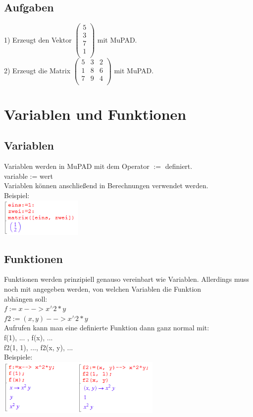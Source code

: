 \documentclass[11pt,final]{scrreprt}
\newcommand{\br} {\medskip\\}
\begin{document}
\subsection{Aufgaben}
1) Erzeugt den Vektor $\left(\begin{matrix}
5\\3\\7\\1\\
\end{matrix}\right)$ mit MuPAD.\\
2) Erzeugt die Matrix $\left(\begin{matrix}
5 & 3 & 2\\1 & 8 & 6\\7 & 9 & 4\\
\end{matrix}\right)$ mit MuPAD.

\section{Variablen und Funktionen}
\subsection{Variablen}
Variablen werden in MuPAD mit dem Operator $:=$ definiert.\\
variable := wert\\
Variablen können anschließend in Berechnungen verwendet werden.\\
Beispiel:\br
\includegraphics[width = 150px]{images/variablen_1}

\subsection{Funktionen}

Funktionen werden prinzipiell genauso vereinbart wie Variablen. Allerdings muss noch mit angegeben werden, von welchen Variablen die Funktion\\ abhängen soll:\\
$f := x --> x ^\wedge 2 * y $\\
$f2 := (x, y) --> x ^\wedge 2 * y $\\
Aufrufen kann man eine definierte Funktion dann ganz normal mit:\\
f(1), ... , f(x), ...\\
f2(1, 1), ..., f2(x, y), ...\\
Beispiele:\\
\includegraphics[width = 300px]{images/funktionen_1}
\end{document}
